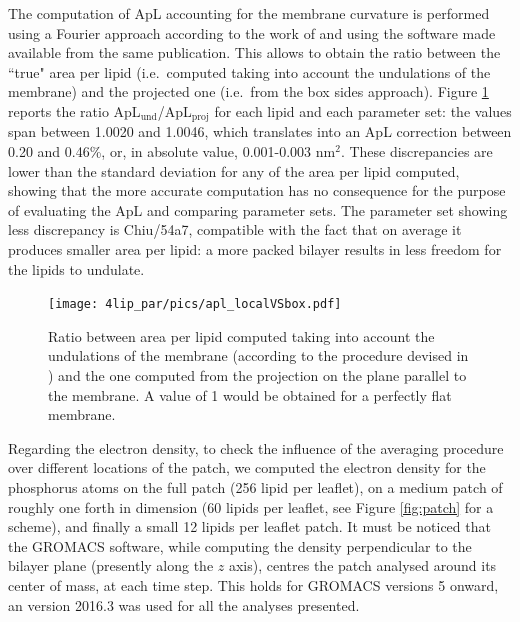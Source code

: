 The computation of ApL accounting for the membrane curvature is performed using a Fourier approach according to the work of \citet{Braun2011} and using the software made available from the same publication.
%
This allows to obtain the ratio between the ``true" area per lipid (i.e.\ computed taking into account the undulations of the membrane) and the projected one (i.e.\ from the box sides approach).
%
Figure \ref{fig:apl_und} reports the ratio ApL$_{\text{und}}$/ApL$_{\text{proj}}$ for each lipid and each parameter set: the values span between 1.0020 and 1.0046, which translates into an ApL correction between 0.20 and 0.46\%, or, in absolute value, 0.001-0.003 nm$^2$.
%
These discrepancies are lower than the standard deviation for any of the area per lipid computed, showing that the more accurate computation has no consequence for the purpose of evaluating the ApL and comparing parameter sets.
%
The parameter set showing less discrepancy is Chiu/54a7, compatible with the fact that on average it produces smaller area per lipid: a more packed bilayer results in less freedom for the lipids to undulate.

\begin{figure}[h!]
	\centering
	\texttt{[image: 4lip\_par/pics/apl\_localVSbox.pdf]}
	\caption[Comparison between methods to compute ApL]{Ratio between area per lipid computed taking into account the undulations of the membrane (according to the procedure devised in \citet{Braun2011}) and the one computed from the projection on the plane parallel to the membrane. A value of 1 would be obtained for a perfectly flat membrane.}
	\label{fig:apl_und}
\end{figure}

Regarding the electron density, to check the influence of the averaging procedure over different locations of the patch, we computed the electron density for the phosphorus atoms on the full patch (256 lipid per leaflet), on a medium patch of roughly one forth in dimension (60 lipids per leaflet, see Figure \ref{fig:patch} for a scheme), and finally a small 12 lipids per leaflet patch. It must be noticed that the GROMACS software, while computing the density perpendicular to the bilayer plane (presently along the $z$ axis), centres the patch analysed around its center of mass, at each time step. This holds for GROMACS versions 5 onward, an version 2016.3 was used for all the analyses presented.

